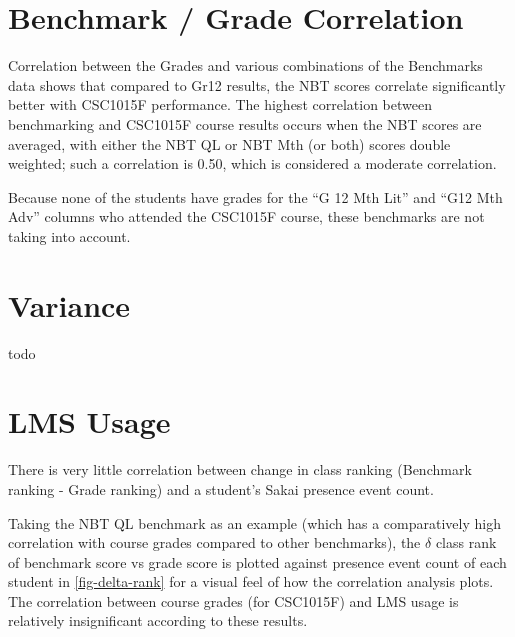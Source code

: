 \section{Benchmark / Grade Correlation}
Correlation between the Grades and various combinations of the Benchmarks data shows that compared to Gr12 results, the NBT scores correlate significantly better with CSC1015F performance. The highest correlation between benchmarking and CSC1015F course results occurs when the NBT scores are averaged, with either the NBT QL or NBT Mth (or both) scores double weighted; such a correlation is 0.50, which is considered a moderate correlation.

Because none of the students have grades for the ``G 12 Mth Lit'' and ``G12 Mth Adv'' columns who attended the CSC1015F course, these benchmarks are not taking into account.

\section{Variance}
todo

\section{LMS Usage}
There is very little correlation between change in class ranking (Benchmark ranking - Grade ranking) and a student's Sakai presence event count.

Taking the NBT QL benchmark as an example (which has a comparatively high correlation with course grades compared to other benchmarks), the \( \delta \) class rank of benchmark score vs grade score is plotted against presence event count of each student in \ref{fig-delta-rank} for a visual feel of how the correlation analysis plots. The correlation between course grades (for CSC1015F) and LMS usage is relatively insignificant according to these results.

